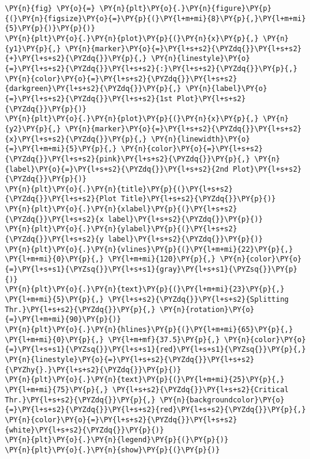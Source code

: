     \begin{tcolorbox}[breakable, size=fbox, boxrule=1pt, pad at break*=1mm,colback=cellbackground, colframe=cellborder]
\begin{Verbatim}[commandchars=\\\{\}]
\PY{n}{fig} \PY{o}{=} \PY{n}{plt}\PY{o}{.}\PY{n}{figure}\PY{p}{(}\PY{n}{figsize}\PY{o}{=}\PY{p}{(}\PY{l+m+mi}{8}\PY{p}{,}\PY{l+m+mi}{5}\PY{p}{)}\PY{p}{)}
\PY{n}{plt}\PY{o}{.}\PY{n}{plot}\PY{p}{(}\PY{n}{x}\PY{p}{,} \PY{n}{y1}\PY{p}{,} \PY{n}{marker}\PY{o}{=}\PY{l+s+s2}{\PYZdq{}}\PY{l+s+s2}{+}\PY{l+s+s2}{\PYZdq{}}\PY{p}{,} \PY{n}{linestyle}\PY{o}{=}\PY{l+s+s2}{\PYZdq{}}\PY{l+s+s2}{:}\PY{l+s+s2}{\PYZdq{}}\PY{p}{,} \PY{n}{color}\PY{o}{=}\PY{l+s+s2}{\PYZdq{}}\PY{l+s+s2}{darkgreen}\PY{l+s+s2}{\PYZdq{}}\PY{p}{,} \PY{n}{label}\PY{o}{=}\PY{l+s+s2}{\PYZdq{}}\PY{l+s+s2}{1st Plot}\PY{l+s+s2}{\PYZdq{}}\PY{p}{)}
\PY{n}{plt}\PY{o}{.}\PY{n}{plot}\PY{p}{(}\PY{n}{x}\PY{p}{,} \PY{n}{y2}\PY{p}{,} \PY{n}{marker}\PY{o}{=}\PY{l+s+s2}{\PYZdq{}}\PY{l+s+s2}{x}\PY{l+s+s2}{\PYZdq{}}\PY{p}{,} \PY{n}{linewidth}\PY{o}{=}\PY{l+m+mi}{5}\PY{p}{,} \PY{n}{color}\PY{o}{=}\PY{l+s+s2}{\PYZdq{}}\PY{l+s+s2}{pink}\PY{l+s+s2}{\PYZdq{}}\PY{p}{,} \PY{n}{label}\PY{o}{=}\PY{l+s+s2}{\PYZdq{}}\PY{l+s+s2}{2nd Plot}\PY{l+s+s2}{\PYZdq{}}\PY{p}{)}
\PY{n}{plt}\PY{o}{.}\PY{n}{title}\PY{p}{(}\PY{l+s+s2}{\PYZdq{}}\PY{l+s+s2}{Plot Title}\PY{l+s+s2}{\PYZdq{}}\PY{p}{)}
\PY{n}{plt}\PY{o}{.}\PY{n}{xlabel}\PY{p}{(}\PY{l+s+s2}{\PYZdq{}}\PY{l+s+s2}{x label}\PY{l+s+s2}{\PYZdq{}}\PY{p}{)}
\PY{n}{plt}\PY{o}{.}\PY{n}{ylabel}\PY{p}{(}\PY{l+s+s2}{\PYZdq{}}\PY{l+s+s2}{y label}\PY{l+s+s2}{\PYZdq{}}\PY{p}{)}
\PY{n}{plt}\PY{o}{.}\PY{n}{vlines}\PY{p}{(}\PY{l+m+mi}{22}\PY{p}{,} \PY{l+m+mi}{0}\PY{p}{,} \PY{l+m+mi}{120}\PY{p}{,} \PY{n}{color}\PY{o}{=}\PY{l+s+s1}{\PYZsq{}}\PY{l+s+s1}{gray}\PY{l+s+s1}{\PYZsq{}}\PY{p}{)}
\PY{n}{plt}\PY{o}{.}\PY{n}{text}\PY{p}{(}\PY{l+m+mi}{23}\PY{p}{,} \PY{l+m+mi}{5}\PY{p}{,} \PY{l+s+s2}{\PYZdq{}}\PY{l+s+s2}{Splitting Thr.}\PY{l+s+s2}{\PYZdq{}}\PY{p}{,} \PY{n}{rotation}\PY{o}{=}\PY{l+m+mi}{90}\PY{p}{)}
\PY{n}{plt}\PY{o}{.}\PY{n}{hlines}\PY{p}{(}\PY{l+m+mi}{65}\PY{p}{,} \PY{l+m+mi}{0}\PY{p}{,} \PY{l+m+mf}{37.5}\PY{p}{,} \PY{n}{color}\PY{o}{=}\PY{l+s+s1}{\PYZsq{}}\PY{l+s+s1}{red}\PY{l+s+s1}{\PYZsq{}}\PY{p}{,} \PY{n}{linestyle}\PY{o}{=}\PY{l+s+s2}{\PYZdq{}}\PY{l+s+s2}{\PYZhy{}.}\PY{l+s+s2}{\PYZdq{}}\PY{p}{)}
\PY{n}{plt}\PY{o}{.}\PY{n}{text}\PY{p}{(}\PY{l+m+mi}{25}\PY{p}{,} \PY{l+m+mi}{75}\PY{p}{,} \PY{l+s+s2}{\PYZdq{}}\PY{l+s+s2}{Critical Thr.}\PY{l+s+s2}{\PYZdq{}}\PY{p}{,} \PY{n}{backgroundcolor}\PY{o}{=}\PY{l+s+s2}{\PYZdq{}}\PY{l+s+s2}{red}\PY{l+s+s2}{\PYZdq{}}\PY{p}{,} \PY{n}{color}\PY{o}{=}\PY{l+s+s2}{\PYZdq{}}\PY{l+s+s2}{white}\PY{l+s+s2}{\PYZdq{}}\PY{p}{)}
\PY{n}{plt}\PY{o}{.}\PY{n}{legend}\PY{p}{(}\PY{p}{)}
\PY{n}{plt}\PY{o}{.}\PY{n}{show}\PY{p}{(}\PY{p}{)}
\end{Verbatim}
\end{tcolorbox}

